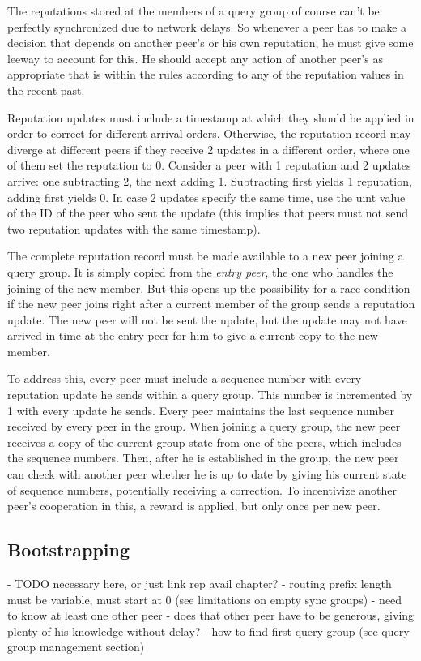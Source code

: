 The reputations stored at the members of a query group of course can't be
perfectly synchronized due to network delays. So whenever a peer has to make a
decision that depends on another peer's or his own reputation, he must give some
leeway to account for this. He should accept any action of another peer's as
appropriate that is within the rules according to any of the reputation values
in the recent past.

Reputation updates must include a timestamp at which they should be applied in
order to correct for different arrival orders. Otherwise, the reputation record
may diverge at different peers if they receive 2 updates in a different order,
where one of them set the reputation to 0. Consider a peer with 1 reputation and
2 updates arrive: one subtracting 2, the next adding 1. Subtracting first yields
1 reputation, adding first yields 0. In case 2 updates specify the same time,
use the uint value of the ID of the peer who sent the update (this implies that
peers must not send two reputation updates with the same timestamp).

The complete reputation record must be made available to a new peer joining a
query group. It is simply copied from the \emph{entry peer}, the one who handles
the joining of the new member. But this opens up the possibility for a race
condition if the new peer joins right after a current member of the group sends
a reputation update. The new peer will not be sent the update, but the update
may not have arrived in time at the entry peer for him to give a current copy to
the new member.

To address this, every peer must include a sequence number with every reputation
update he sends within a query group. This number is incremented by 1 with every
update he sends. Every peer maintains the last sequence number received by every
peer in the group. When joining a query group, the new peer receives a copy of
the current group state from one of the peers, which includes the sequence
numbers. Then, after he is established in the group, the new peer can check with
another peer whether he is up to date by giving his current state of sequence
numbers, potentially receiving a correction. To incentivize another peer's
cooperation in this, a reward is applied, but only once per new peer.

\subsection{Bootstrapping}
\label{sec:desc_bootstrapping}
- TODO necessary here, or just link rep avail chapter?
- routing prefix length must be variable, must start at 0 (see limitations on
  empty sync groups)
- need to know at least one other peer
- does that other peer have to be generous, giving plenty of his knowledge
  without delay?
- how to find first query group (see query group management section)

